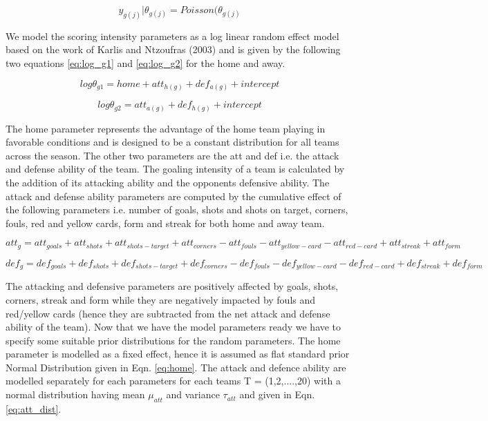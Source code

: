 \documentclass{article}
\begin{document}
\begin{equation}
y_{g(j)} | \theta_{g(j)} = Poisson(\theta_{g(j)}
\label{eq:y_theta}
\end{equation}

We model the scoring intensity parameters as a log linear random effect model based on the work of Karlis and Ntzoufras (2003) \cite{karlis_ntzoufras_2003} and is given by the following two equations \ref{eq:log_g1} and \ref{eq:log_g2} for the home and away.


\begin{equation}
log \theta_{g1} = home + att_{h(g)} + def_{a(g)} + intercept
\label{eq:log_g1}
\end{equation}

\begin{equation}
log \theta_{g2} = att_{a(g)} + def_{h(g)} + intercept
\label{eq:log_g2}
\end{equation}

The home parameter represents the advantage of the home team playing in favorable conditions and is designed to be a constant distribution for all teams across the season. The other two parameters are the att and def  i.e. the attack and defense ability of the team. The goaling intensity of a team is calculated by the addition of its attacking ability and the opponents defensive ability. The attack and defense ability parameters are computed by the cumulative effect of the following parameters i.e. number of goals, shots and shots on target, corners, fouls, red and yellow cards, form and streak for both home and away team.

\begin{equation}
att_g = att_{goals} + att_{shots} + att_{shots-target} + att_{corners} - att_{fouls} - att_{yellow-card} - att_{red-card} + att_{streak} +att_{form}
\label{eq:att}
\end{equation}

\begin{equation}
def_g = def_{goals} + def_{shots} + def_{shots-target} + def_{corners} - def_{fouls} - def_{yellow-card} - def_{red-card} + def_{streak} +def_{form}
\label{eq:def}
\end{equation}

The attacking and defensive parameters are positively affected by goals, shots, corners, streak and form while they are negatively impacted by fouls and red/yellow cards (hence they are subtracted from the net attack and defense ability of the team). Now that we have the model parameters ready we have to specify some suitable prior distributions for the random parameters. The home parameter is modelled as a fixed effect, hence it is assumed as flat standard prior Normal Distribution given in Eqn. \ref{eq:home}. The attack and defence ability are modelled separately for each parameters for each teams T = (1,2,....,20) with a normal distribution having mean $\mu_{att}$ and variance $\tau_{att}$ and given in Eqn. \ref{eq:att_dist}.
\end{document}
